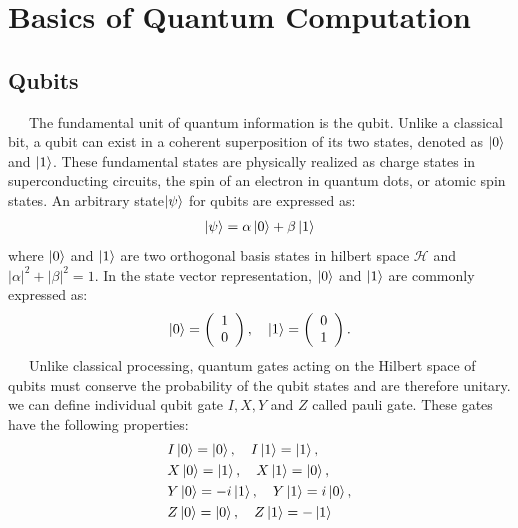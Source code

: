 \documentclass[a4paper,11pt]{ltjsarticle}
\begin{document}
\section{Basics of Quantum Computation}{
    \subsection{Qubits \cite{devitt2013}}\label{qubits}{
        \ \ \ The fundamental unit of quantum information is the qubit. Unlike a classical bit, a qubit can exist in a coherent superposition of its two states, denoted as $\ket{0}$ and $\ket{1}$. These fundamental states are physically realized as charge states in superconducting circuits, the spin of an electron in quantum dots, or atomic spin states. An arbitrary state$\ket{\psi}$ for qubits are expressed as:
        \begin{align}
            \ket{\psi}=\alpha\ket{0}+\beta\ket{1}
        \end{align}
        where $\ket{0}$ and $\ket{1}$ are two orthogonal basis states in hilbert space $\mathcal{H}$ and $|\alpha|^2+|\beta|^2=1$. In the state vector representation, $\ket{0}$ and $\ket{1}$ are commonly expressed as:
        \begin{align}
            \ket{0} =\left(\begin{array}{c}
                1\\
                0
            \end{array}\right),\ \ \ 
            \ket{1} =\left(\begin{array}{c}
                0\\
                1
            \end{array}\right).
        \end{align}
        \ \ \ Unlike classical processing, quantum gates acting on the Hilbert space of qubits must conserve the probability of the qubit states and are therefore unitary. we can define individual qubit gate $I, X, Y$ and $Z$ called pauli gate. These gates have the following properties:
        \begin{align}
            &I\ket{0}=\ket{0},\ \ \ I\ket{1}=\ket{1},\nonumber\\
            &X\ket{0}=\ket{1},\ \ \ X\ket{1}=\ket{0},\\
            &Y\ket{0}=-i\ket{1},\ \ \ Y\ket{1}=i\ket{0},\nonumber\\
            &Z\ket{0}=\ket{0},\ \ \ Z\ket{1}=-\ket{1}\nonumber
        \end{align}
}}
\end{document}

